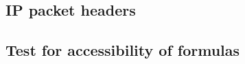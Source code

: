 \subsection{IP packet headers}
\label{sec:ipheaders}

%
%

%
%

\subsection{Test for accessibility of formulas}


